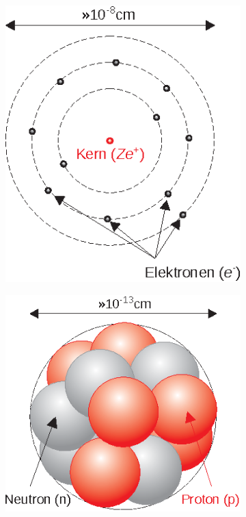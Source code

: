 \begin{figure}[bt]
	\centering

	\begin{subfigure}[b]{0.3\textwidth}
		\includegraphics[width=\textwidth]{fig/i_01_atom.eps}
		\caption{}
		\label{fig:i_01_atom}
	\end{subfigure}
	\qquad\qquad\qquad\qquad
	\begin{subfigure}[b]{0.3\textwidth}
		\includegraphics[width=\textwidth]{fig/i_02_kern.eps}
		\caption{}
		\label{fig:i_01_kern}
	\end{subfigure}


\end{figure}

